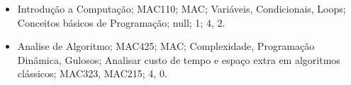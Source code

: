 \documentclass{report}
\begin{document}
\begin{itemize}
	\item Introdução a Computação; MAC110; MAC; Variáveis, Condicionais, Loops; Conceitos básicos de Programação; null; 1; 4, 2.
	\item Analise de Algoritmo; MAC425; MAC; Complexidade, Programação Dinâmica, Gulosos; Analisar custo de tempo e espaço extra em algoritmos clássicos; MAC323, MAC215; 4, 0.
\end{itemize}
%			
%
%
\end{document}
